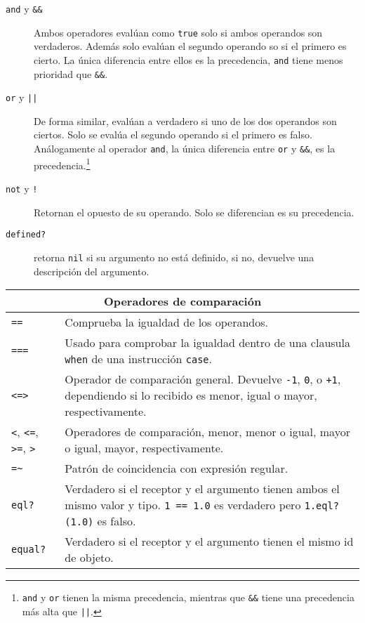 \begin{description}
	\item[\texttt{and} y \texttt{\&\&}] Ambos operadores evalúan como \texttt{true} solo si ambos operandos son verdaderos. Además solo evalúan el segundo operando so si el primero es cierto. La única diferencia entre ellos es la precedencia, \texttt{and} tiene menos prioridad que \texttt{\&\&}.
	\item[\texttt{or} y \texttt{||}] De forma similar, evalúan a verdadero si uno de los dos operandos son ciertos. Solo se evalúa el segundo operando si el primero es falso. Análogamente al operador \texttt{and}, la única diferencia entre \texttt{or} y \texttt{\&\&}, es la precedencia.\footnote{\texttt{and} y \texttt{or} tienen la misma precedencia, mientras que \texttt{\&\&} tiene una precedencia más alta que \texttt{||}.}
	\item[\texttt{not} y \texttt{!}] Retornan el opuesto de su operando. Solo se diferencian es su precedencia.
	\item[\texttt{defined?}] retorna \texttt{nil} si su argumento no está definido, si no, devuelve una descripción del argumento.
\end{description}

\begin{center}
	\begin{tabular}{ | p{2cm} | p{10cm} | }
		\hline
		\multicolumn{2}{|c|}{Operadores de comparación} \\
		\hline
		\texttt{==} & Comprueba la igualdad de los operandos. \\
		\texttt{===} & Usado para comprobar la igualdad dentro de una clausula \texttt{when} de una instrucción \texttt{case}. \\
		\texttt{<=>} & Operador de comparación general. Devuelve \texttt{-1}, \texttt{0}, o \texttt{+1}, dependiendo si lo recibido es menor, igual o mayor, respectivamente. \\		
		\texttt{<}, \texttt{<=}, \texttt{>=}, \texttt{>} & Operadores de comparación, menor, menor o igual, mayor o igual, mayor, respectivamente. \\
		\texttt{=\textasciitilde{}} & Patrón de coincidencia con expresión regular. \\
		\texttt{eql?} & Verdadero si el receptor y el argumento tienen ambos el mismo valor y tipo. \texttt{1 == 1.0} es verdadero pero \texttt{1.eql?(1.0)} es falso. \\
		\texttt{equal?} & Verdadero si el receptor y el argumento tienen el mismo id de objeto. \\
		\hline
	\end{tabular}
\end{center}

